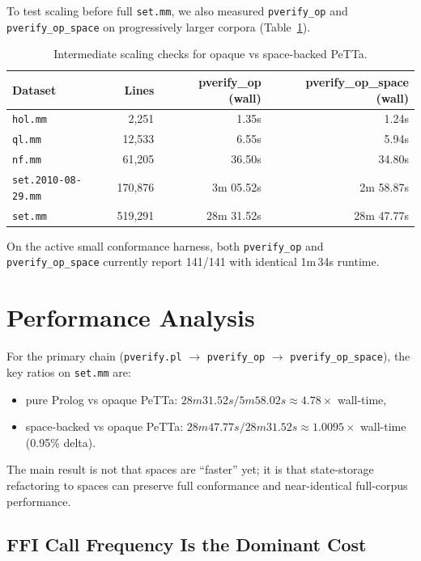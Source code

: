 \documentclass[11pt]{article}
\begin{document}
To test scaling before full \texttt{set.mm}, we also measured
\texttt{pverify\_op} and \texttt{pverify\_op\_space} on progressively
larger corpora (Table~\ref{tab:scaling}).

\begin{table}[ht]
\centering
\caption{Intermediate scaling checks for opaque vs space-backed PeTTa.}
\label{tab:scaling}
\begin{tabular}{lrrr}
\toprule
\textbf{Dataset} & \textbf{Lines} & \textbf{pverify\_op (wall)} & \textbf{pverify\_op\_space (wall)} \\
\midrule
\texttt{hol.mm}              & 2{,}251   & 1.35s    & 1.24s \\
\texttt{ql.mm}               & 12{,}533  & 6.55s    & 5.94s \\
\texttt{nf.mm}               & 61{,}205  & 36.50s   & 34.80s \\
\texttt{set.2010-08-29.mm}   & 170{,}876 & 3m 05.52s & 2m 58.87s \\
\texttt{set.mm}              & 519{,}291 & 28m 31.52s & 28m 47.77s \\
\bottomrule
\end{tabular}
\end{table}

On the active small conformance harness, both
\texttt{pverify\_op} and \texttt{pverify\_op\_space} currently report
141/141 with identical 1m\,34s runtime.

\section{Performance Analysis}
\label{sec:perf}

For the primary chain (\texttt{pverify.pl} $\rightarrow$
\texttt{pverify\_op} $\rightarrow$ \texttt{pverify\_op\_space}),
the key ratios on \texttt{set.mm} are:
\begin{itemize}[leftmargin=2em]
  \item pure Prolog vs opaque PeTTa:
    $28m31.52s / 5m58.02s \approx 4.78\times$ wall-time,
  \item space-backed vs opaque PeTTa:
    $28m47.77s / 28m31.52s \approx 1.0095\times$ wall-time
    (0.95\% delta).
\end{itemize}
The main result is not that spaces are ``faster'' yet; it is that
state-storage refactoring to spaces can preserve full conformance
and near-identical full-corpus performance.

\subsection{FFI Call Frequency Is the Dominant Cost}
\end{document}
